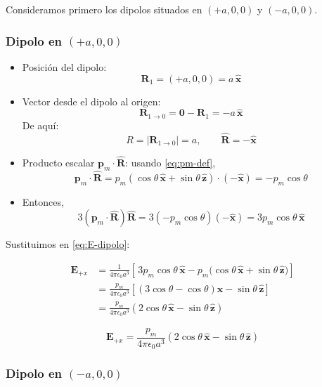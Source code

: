 \documentclass{article}
\begin{document}
Consideramos primero los dipolos situados en $(+a,0,0)$ y $(-a,0,0)$.

\subsubsection*{Dipolo en $(+a,0,0)$}

\begin{itemize}
  \item Posición del dipolo:
    \[
    \mathbf{R}_{1} = (+a,0,0) = a\,\hat{\mathbf{x}}
    \]
  \item Vector desde el dipolo al origen:
    \[
    \mathbf{R}_{1\to 0} = \mathbf{0} - \mathbf{R}_{1}
    = -a\,\hat{\mathbf{x}}
    \]
    De aquí:
    \[
    R = |\mathbf{R}_{1\to 0}| = a,
    \qquad
    \hat{\mathbf{R}} = -\hat{\mathbf{x}}
    \]
  \item Producto escalar $\mathbf{p}_{m}\cdot\hat{\mathbf{R}}$:
    usando \eqref{eq:pm-def},
    \[
    \mathbf{p}_{m}\cdot\hat{\mathbf{R}}
    = p_{m}(\cos\theta\,\hat{\mathbf{x}} + \sin\theta\,\hat{\mathbf{z}})
      \cdot(-\hat{\mathbf{x}})
    = -p_{m}\cos\theta
    \]
  \item Entonces,
    \[
    3(\mathbf{p}_{m}\cdot\hat{\mathbf{R}})\hat{\mathbf{R}}
    = 3(-p_{m}\cos\theta)(-\hat{\mathbf{x}})
    = 3p_{m}\cos\theta\,\hat{\mathbf{x}}
    \]
\end{itemize}

Sustituimos en \eqref{eq:E-dipolo}:

\begin{align}
\mathbf{E}_{+x}
&= \frac{1}{4\pi\epsilon_{0}a^{3}}
\left[\,3p_{m}\cos\theta\,\hat{\mathbf{x}}
       - p_{m}\bigl(\cos\theta\,\hat{\mathbf{x}}
                   + \sin\theta\,\hat{\mathbf{z}}\bigr)\right]\\[4pt]
&= \frac{p_{m}}{4\pi\epsilon_{0}a^{3}}
\left[(3\cos\theta - \cos\theta)\hat{\mathbf{x}}
      - \sin\theta\,\hat{\mathbf{z}}\right]\\[4pt]
&= \frac{p_{m}}{4\pi\epsilon_{0}a^{3}}
\left(2\cos\theta\,\hat{\mathbf{x}} - \sin\theta\,\hat{\mathbf{z}}\right)
\end{align}

\begin{equation}
\boxed{
\mathbf{E}_{+x}
= \frac{p_{m}}{4\pi\epsilon_{0}a^{3}}
  \left(2\cos\theta\,\hat{\mathbf{x}} - \sin\theta\,\hat{\mathbf{z}}\right)
}
\label{eq:Ex-mas}
\end{equation}

\subsubsection*{Dipolo en $(-a,0,0)$}
\end{document}
